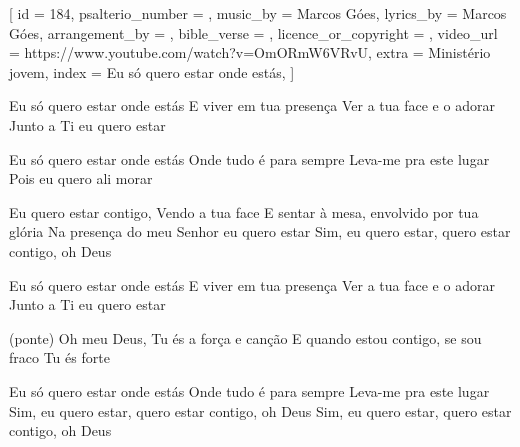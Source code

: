 [
    id                     = {184},
    psalterio_number       = {},
    music_by               = {Marcos Góes},
    lyrics_by              = {Marcos Góes},
    arrangement_by         = {},
    bible_verse            = {},
    licence_or_copyright   = {},
    video_url              = {https://www.youtube.com/watch?v=OmORmW6VRvU},
    extra                  = {Ministério jovem},
    index                  = {Eu só quero estar onde estás},
]

\beginverse
Eu só quero estar onde estás
E viver em tua presença
Ver a tua face e o adorar
Junto a Ti eu quero estar
\endverse

\beginverse
Eu só quero estar onde estás
Onde tudo é para sempre
Leva-me pra este lugar
Pois eu quero ali morar
\endverse

\beginchorus
Eu quero estar contigo,
Vendo a tua face
E sentar à mesa, envolvido por tua glória
Na presença do meu Senhor eu quero estar
Sim, eu quero estar, quero estar contigo, oh Deus
\endchorus


\beginverse
Eu só quero estar onde estás
E viver em tua presença
Ver a tua face e o adorar
Junto a Ti eu quero estar

(ponte)
Oh meu Deus, Tu és a força e canção
E quando estou contigo, se sou fraco Tu és forte
\endverse

\beginverse
Eu só quero estar onde estás
Onde tudo é para sempre
Leva-me pra este lugar
Sim, eu quero estar, quero estar contigo, oh Deus
Sim, eu quero estar, quero estar contigo, oh Deus
\endverse

\endsong
